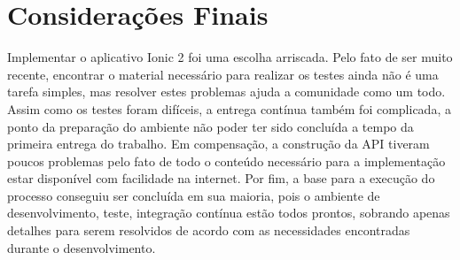 \section{Considerações Finais}
Implementar o aplicativo Ionic 2 foi uma escolha arriscada. Pelo fato de ser muito recente, encontrar o material necessário para realizar os testes ainda não é uma tarefa simples, mas resolver estes problemas ajuda a comunidade como um todo. Assim como os testes foram difíceis, a entrega contínua também foi complicada, a ponto da preparação do ambiente não poder ter sido concluída a tempo da primeira entrega do trabalho. Em compensação, a construção da API tiveram poucos problemas pelo fato de todo o conteúdo necessário para a implementação estar disponível com facilidade na internet. Por fim, a base para a execução do processo conseguiu ser concluída em sua maioria, pois o ambiente de desenvolvimento, teste, integração contínua estão todos prontos, sobrando apenas detalhes para serem resolvidos de acordo com as necessidades encontradas durante o desenvolvimento.
